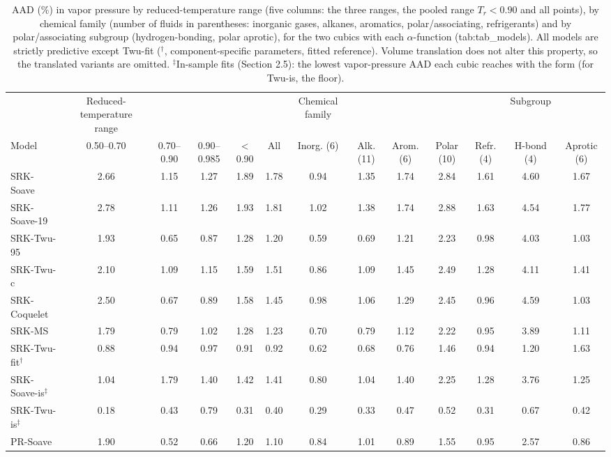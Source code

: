 \begin{table}[H]
\centering
\caption{AAD (\%) in vapor pressure by reduced-temperature range (five columns: the three ranges, the pooled range $T_r < 0.90$ and all points), by chemical family (number of fluids in parentheses: inorganic gases, alkanes, aromatics, polar/associating, refrigerants) and by polar/associating subgroup (hydrogen-bonding, polar aprotic), for the two cubics with each $\alpha$-function ({tab:tab_models}). All models are strictly predictive except Twu-fit ($^{\dagger}$, component-specific parameters, fitted reference). Volume translation does not alter this property, so the translated variants are omitted. $^{\ddagger}$In-sample fits (Section 2.5): the lowest vapor-pressure AAD each cubic reaches with the form (for Twu-is, the floor).}
\label{tab:tab_psat}
\small
\begin{tabular}{lcccccccccccc}
\toprule
 & Reduced-temperature range &  &  &  &  & Chemical family &  &  &  &  & Subgroup &  \\
Model & 0.50--0.70 & 0.70--0.90 & 0.90--0.985 & < 0.90 & All & Inorg. (6) & Alk. (11) & Arom. (6) & Polar (10) & Refr. (4) & H-bond (4) & Aprotic (6) \\
\midrule
SRK-Soave & 2.66 & 1.15 & 1.27 & 1.89 & 1.78 & 0.94 & 1.35 & 1.74 & 2.84 & 1.61 & 4.60 & 1.67 \\
SRK-Soave-19 & 2.78 & 1.11 & 1.26 & 1.93 & 1.81 & 1.02 & 1.38 & 1.74 & 2.88 & 1.63 & 4.54 & 1.77 \\
SRK-Twu-95 & 1.93 & 0.65 & 0.87 & 1.28 & 1.20 & 0.59 & 0.69 & 1.21 & 2.23 & 0.98 & 4.03 & 1.03 \\
SRK-Twu-c & 2.10 & 1.09 & 1.15 & 1.59 & 1.51 & 0.86 & 1.09 & 1.45 & 2.49 & 1.28 & 4.11 & 1.41 \\
SRK-Coquelet & 2.50 & 0.67 & 0.89 & 1.58 & 1.45 & 0.98 & 1.06 & 1.29 & 2.45 & 0.96 & 4.59 & 1.03 \\
SRK-MS & 1.79 & 0.79 & 1.02 & 1.28 & 1.23 & 0.70 & 0.79 & 1.12 & 2.22 & 0.95 & 3.89 & 1.11 \\
\midrule
SRK-Twu-fit$^{\dagger}$ & 0.88 & 0.94 & 0.97 & 0.91 & 0.92 & 0.62 & 0.68 & 0.76 & 1.46 & 0.94 & 1.20 & 1.63 \\
SRK-Soave-is$^{\ddagger}$ & 1.04 & 1.79 & 1.40 & 1.42 & 1.41 & 0.80 & 1.04 & 1.40 & 2.25 & 1.28 & 3.76 & 1.25 \\
SRK-Twu-is$^{\ddagger}$ & 0.18 & 0.43 & 0.79 & 0.31 & 0.40 & 0.29 & 0.33 & 0.47 & 0.52 & 0.31 & 0.67 & 0.42 \\
\midrule
PR-Soave & 1.90 & 0.52 & 0.66 & 1.20 & 1.10 & 0.84 & 1.01 & 0.89 & 1.55 & 0.95 & 2.57 & 0.86 \\

\end{tabular}
\end{table}
